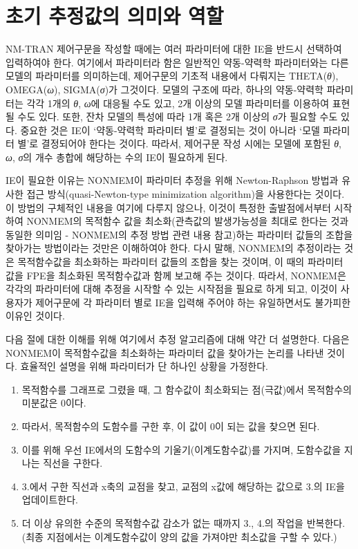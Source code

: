 \documentclass[
  10pt,
]{krantz}
\providecommand{\tightlist}{%
  \setlength{\itemsep}{0pt}\setlength{\parskip}{0pt}}
\begin{document}
\hypertarget{uxcd08uxae30-uxcd94uxc815uxac12uxc758-uxc758uxbbf8uxc640-uxc5eduxd560}{%
\section{초기 추정값의 의미와 역할}\label{uxcd08uxae30-uxcd94uxc815uxac12uxc758-uxc758uxbbf8uxc640-uxc5eduxd560}}

NM-TRAN 제어구문을 작성할 때에는 여러 파라미터에 대한 IE을 반드시 선택하여 입력하여야 한다. 여기에서 파라미터라 함은 일반적인 약동-약력학 파라미터와는 다른 모델의 파라미터를 의미하는데, 제어구문의 기초적 내용에서 다뤄지는 THETA(\emph{θ}), OMEGA(\emph{ω}), SIGMA(\emph{σ})가 그것이다. 모델의 구조에 따라, 하나의 약동-약력학 파라미터는 각각 1개의 \emph{θ}, \emph{ω}에 대응될 수도 있고, 2개 이상의 모델 파라미터를 이용하여 표현될 수도 있다. 또한, 잔차 모델의 특성에 따라 1개 혹은 2개 이상의 \emph{σ}가 필요할 수도 있다. 중요한 것은 IE이 `약동-약력학 파라미터 별'로 결정되는 것이 아니라 `모델 파라미터 별'로 결정되어야 한다는 것이다. 따라서, 제어구문 작성 시에는 모델에 포함된 \emph{θ}, \emph{ω}, \emph{σ}의 개수 총합에 해당하는 수의 IE이 필요하게 된다.

IE이 필요한 이유는 NONMEM이 파라미터 추정을 위해 Newton-Raphson 방법과 유사한 접근 방식(quasi-Newton-type minimization algorithm)을 사용한다는 것이다. 이 방법의 구체적인 내용을 여기에 다루지 않으나, 이것이 특정한 출발점에서부터 시작하여 NONMEM의 목적함수 값을 최소화(관측값의 발생가능성을 최대로 한다는 것과 동일한 의미임 - NONMEM의 추정 방법 관련 내용 참고)하는 파라미터 값들의 조합을 찾아가는 방법이라는 것만은 이해하여야 한다. 다시 말해, NONMEM의 추정이라는 것은 목적함수값을 최소화하는 파라미터 값들의 조합을 찾는 것이며, 이 때의 파라미터 값을 FPE을 최소화된 목적함수값과 함께 보고해 주는 것이다. 따라서, NONMEM은 각각의 파라미터에 대해 추정을 시작할 수 있는 시작점을 필요로 하게 되고, 이것이 사용자가 제어구문에 각 파라미터 별로 IE을 입력해 주어야 하는 유일하면서도 불가피한 이유인 것이다.

다음 절에 대한 이해를 위해 여기에서 추정 알고리즘에 대해 약간 더 설명한다. 다음은 NONMEM이 목적함수값을 최소화하는 파라미터 값을 찾아가는 논리를 나타낸 것이다. 효율적인 설명을 위해 파라미터가 단 하나인 상황을 가정한다.

\begin{enumerate}
\def\labelenumi{\arabic{enumi}.}
\tightlist
\item
  목적함수를 그래프로 그렸을 때, 그 함수값이 최소화되는 점(극값)에서 목적함수의 미분값은 0이다.
\item
  따라서, 목적함수의 도함수를 구한 후, 이 값이 0이 되는 값을 찾으면 된다.
\item
  이를 위해 우선 IE에서의 도함수의 기울기(이계도함수값)를 가지며, 도함수값을 지나는 직선을 구한다.
\item
  3.에서 구한 직선과 x축의 교점을 찾고, 교점의 x값에 해당하는 값으로 3.의 IE을 업데이트한다.
\item
  더 이상 유의한 수준의 목적함수값 감소가 없는 때까지 3., 4.의 작업을 반복한다. (최종 지점에서는 이계도함수값이 양의 값을 가져야만 최소값을 구할 수 있다.)
\end{enumerate}
\end{document}

